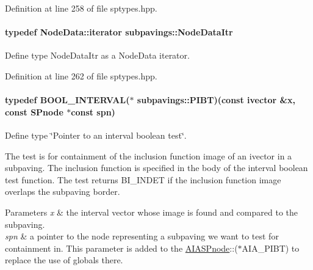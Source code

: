 \-Definition at line 258 of file sptypes.\-hpp.

\hypertarget{namespacesubpavings_af79bf496cfc0df4bddcbe13a62f12bff}{
\paragraph[{\-Node\-Data\-Itr}]{\setlength{\rightskip}{0pt plus 5cm}typedef \-Node\-Data\-::iterator {\bf subpavings\-::\-Node\-Data\-Itr}}}\label{namespacesubpavings_af79bf496cfc0df4bddcbe13a62f12bff}


\-Define type \-Node\-Data\-Itr as a \-Node\-Data iterator. 



\-Definition at line 262 of file sptypes.\-hpp.

\hypertarget{namespacesubpavings_a4ca48fac31a3dcc26d5b51b1ee3cd0d9}{
\paragraph[{\-P\-I\-B\-T}]{\setlength{\rightskip}{0pt plus 5cm}typedef {\bf \-B\-O\-O\-L\-\_\-\-I\-N\-T\-E\-R\-V\-A\-L}($\ast$ {\bf subpavings\-::\-P\-I\-B\-T})(const ivector \&x, const {\bf \-S\-Pnode} $\ast$const spn)}}\label{namespacesubpavings_a4ca48fac31a3dcc26d5b51b1ee3cd0d9}


\-Define type \char`\"{}\-Pointer to an interval boolean test\char`\"{}. 

\-The test is for containment of the inclusion function image of an ivector in a subpaving. \-The inclusion function is specified in the body of the interval boolean test function. \-The test returns \-B\-I\-\_\-\-I\-N\-D\-E\-T if the inclusion function image overlaps the subpaving border.


\begin{DoxyParams}{\-Parameters}
{\em x} & the interval vector whose image is found and compared to the subpaving. \\
\hline
{\em spn} & a pointer to the node representing a subpaving we want to test for containment in. \-This parameter is added to the \hyperlink{classAIASPnode}{\-A\-I\-A\-S\-Pnode}\-:\-:($\ast$\-A\-I\-A\-\_\-\-P\-I\-B\-T) to replace the use of globals there. \\
\hline
\end{DoxyParams}



